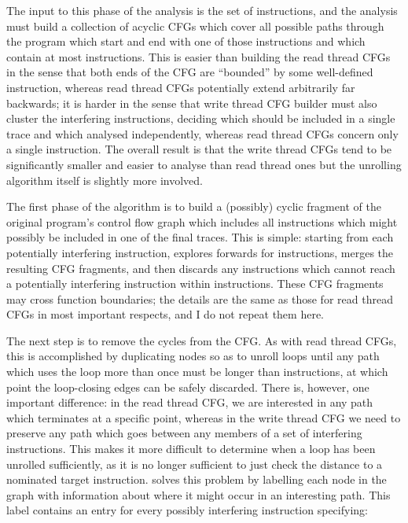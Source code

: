 The input to this phase of the analysis is the set of
 instructions, and the analysis must build
a collection of acyclic CFGs which cover all possible paths through
the program which start and end with one of those instructions and
which contain at most \backref{$\alpha$} instructions.  This is easier
than building the read thread CFGs in the sense that both ends of the
CFG are ``bounded'' by some well-defined instruction, whereas read
thread CFGs potentially extend arbitrarily far backwards; it is harder
in the sense that write thread CFG builder must also cluster the
interfering instructions, deciding which should be included in a
single trace and which analysed independently, whereas read thread
CFGs concern only a single instruction.  The overall result is that
the write thread CFGs tend to be significantly smaller and easier to
analyse than read thread ones but the unrolling algorithm itself is
slightly more involved.

The first phase of the algorithm is to build a (possibly) cyclic
fragment of the original program's control flow graph which includes
all instructions which might possibly be included in one of the final
traces.  This is simple: starting from each potentially interfering
instruction, {\technique} explores forwards for \backref{$\alpha$}
instructions, merges the resulting CFG fragments, and then discards
any instructions which cannot reach a potentially interfering
instruction within \backref{$\alpha$} instructions.  These CFG
fragments may cross function boundaries; the details are the same as
those for read thread CFGs in most important respects, and I do not
repeat them here.

The next step is to remove the cycles from the CFG.  As with read
thread CFGs, this is accomplished by duplicating nodes so as to unroll
loops until any path which uses the loop more than once must be longer
than \backref{$\alpha$} instructions, at which point the loop-closing
edges can be safely discarded.  There is, however, one important
difference: in the read thread CFG, we are interested in any path
which terminates at a specific point, whereas in the write thread CFG
we need to preserve any path which goes between any members of a set
of interfering instructions.  This makes it more difficult to
determine when a loop has been unrolled sufficiently, as it is no
longer sufficient to just check the distance to a nominated target
instruction.  {\Technique} solves this problem by labelling each node
in the graph with information about where it might occur in an
interesting path.  This label contains an entry for every possibly
interfering instruction specifying:

